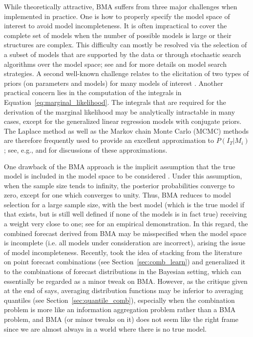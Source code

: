\documentclass[a4paper,11pt]{article}
\begin{document}
While theoretically attractive, BMA suffers from three major challenges when implemented in practice. One is how to properly specify the model space of interest to avoid model incompleteness. It is often impractical to cover the complete set of models when the number of possible models is large or their structures are complex. This difficulty can mostly be resolved via the selection of a subset of models that are supported by the data or through stochastic search algorithms over the model space; see \citet{Hoeting1999-qn} and \citet{Koop2003-nl} for more details on model search strategies. A second well-known challenge relates to the elicitation of two types of priors (on parameters and models) for many models of interest \citep{Moral-Benito2015-zh,Aastveit2018-lf}. Another practical concern lies in the computation of the integrals in Equation~\eqref{eq:marginal_likelihood}. The integrals that are required for the derivation of the marginal likelihood may be analytically intractable in many cases, except for the generalized linear regression models with conjugate priors. The Laplace method as well as the Markov chain Monte Carlo (MCMC) methods are therefore frequently used to provide an excellent approximation to $P(I_{T}|M_{i})$; see, e.g., \citet{Hoeting1999-qn} and \citet{Bassetti2020-uh} for discussions of these approximations.

One drawback of the BMA approach is the implicit assumption that the true model is included in the model space to be considered \citep{Wright2008-bs}. Under this assumption, when the sample size tends to infinity, the posterior probabilities converge to zero, except for one which converges to unity. Thus, BMA reduces to model selection for a large sample size, with the best model (which is the true model if that exists, but is still well defined if none of the models is in fact true) receiving a weight very close to one; see \citet{Geweke2010-zn} for an empirical demonstration. In this regard, the combined forecast derived from BMA may be misspecified when the model space is incomplete (i.e. all models under consideration are incorrect), arising the issue of model incompleteness. Recently, \citet{Yao2018-st} took the idea of stacking from the literature on point forecast combinations (see Section~\ref{sec:comb_learn}) and generalized it to the combinations of forecast distributions in the Bayesian setting, which can essentially be regarded as a minor tweak on BMA. However, as the critique given at the end of \citet{Yao2018-st} says, averaging distribution functions may be inferior to averaging quantiles (see Section~\ref{sec:quantile_comb}), especially when the combination problem is more like an information aggregation problem rather than a BMA problem, and BMA (or minor tweaks on it) does not seem like the right frame since we are almost always in a world where there is no true model.
\end{document}
